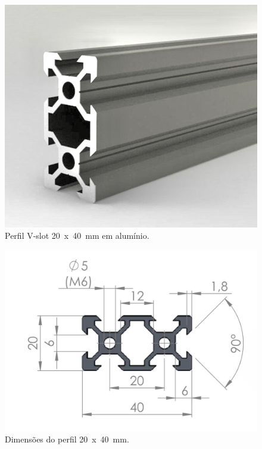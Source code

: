 \begin{figure}[H]
\centering
\caption{Perfil V-slot  20~x~40~mm em alumínio.}\label{fig:p20x40p}
\includegraphics[scale = 0.3]{figuras/p20x40p2}
\end{figure}
    
\begin{figure}[H]
\centering
\caption{Dimensões do perfil 20~x~40~mm.}\label{fig:p20x40d}
\includegraphics[scale = 0.4]{figuras/p20x40d}
\end{figure}
    
